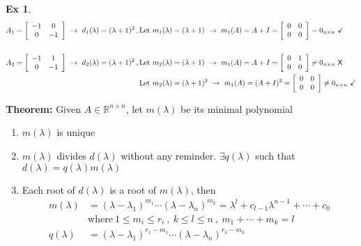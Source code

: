 \documentclass[twoside]{article}
\newtheorem{exmp}[theorem]{Ex}
\begin{document}
\begin{exmp}
\begin{align*}
A_1 =   \left[ \begin{array}{cc} -1 & 0  \\ 0 & -1 \end{array} \right] \ \rightarrow \ d_1(\lambda) = (\lambda + 1)^2 \, , \, &\mathrm{Let} \ m_1(\lambda) = (\lambda + 1) \ \rightarrow \ m_1(A) = A + I =  \left[ \begin{array}{cc} 0 & 0  \\ 0 & 0 \end{array} \right] = 0_{n \times n} \ \checkmark
\\
\\
A_2 =   \left[ \begin{array}{cc} -1 & 1  \\ 0 & -1 \end{array} \right] \ \rightarrow \ d_2(\lambda) = (\lambda + 1)^2 \, , \, &\mathrm{Let} \ m_2(\lambda) = (\lambda + 1) \ \rightarrow \ m_1(A) = A + I =  \left[ \begin{array}{cc} 0 & 1  \\ 0 & 0 \end{array} \right] \neq 0_{n \times n} \ \text{\sffamily X}
\\
&\mathrm{Let} \ m_2(\lambda) = (\lambda + 1)^2 \ \rightarrow \ m_1(A) = (A + I)^2 =  \left[ \begin{array}{cc} 0 & 0  \\ 0 & 0 \end{array} \right] \neq 0_{n \times n} \ \checkmark
\end{align*}
\end{exmp}

\textbf{Theorem:} Given $A \in \mathbb{R}^{n \times n}$, let $m(\lambda)$ be its minimal polynomial 
\begin{enumerate}
	\item $m(\lambda)$ is unique
	\item $m(\lambda)$ divides $d(\lambda)$ without any reminder. $\exists q(\lambda)$ such that $d(\lambda) = q(\lambda) m(\lambda)$ 
	\item Each root of $d(\lambda)$ is a root of $m(\lambda)$, then 
\begin{align*}
m(\lambda) &= (\lambda - \lambda_1)^{m_1} \cdots (\lambda - \lambda_n)^{m_k} = \lambda^l + c_{l-1} \lambda^{n-1} + \cdots + c_0 
\\
&\mathrm{where} \ 1 \leq m_i \leq r_i \ , \ k \leq l \leq n \ , \ m_1 + \cdots + m_k = l
\\
q(\lambda) &= (\lambda - \lambda_1)^{r_1-m_1} \cdots (\lambda - \lambda_n)^{r_k-m_k} 
\end{align*}
\end{enumerate}
\end{document}
